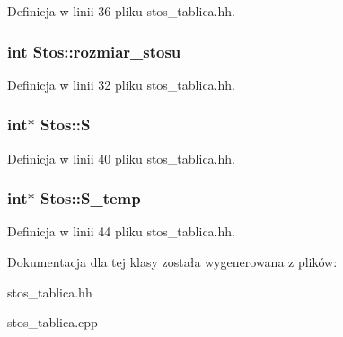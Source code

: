 \-Definicja w linii 36 pliku stos\-\_\-tablica.\-hh.

\hypertarget{class_stos_a62066b06b36c3f672ab0543c66deca28}{
\subsubsection[{rozmiar\-\_\-stosu}]{\setlength{\rightskip}{0pt plus 5cm}int {\bf \-Stos\-::rozmiar\-\_\-stosu}}}\label{class_stos_a62066b06b36c3f672ab0543c66deca28}


\-Definicja w linii 32 pliku stos\-\_\-tablica.\-hh.

\hypertarget{class_stos_a14e6f37b4871dfa99b8260ab550e0de7}{
\subsubsection[{\-S}]{\setlength{\rightskip}{0pt plus 5cm}int$\ast$ {\bf \-Stos\-::\-S}}}\label{class_stos_a14e6f37b4871dfa99b8260ab550e0de7}


\-Definicja w linii 40 pliku stos\-\_\-tablica.\-hh.

\hypertarget{class_stos_ae4176be703c706597b6918dc145dea84}{
\subsubsection[{\-S\-\_\-temp}]{\setlength{\rightskip}{0pt plus 5cm}int$\ast$ {\bf \-Stos\-::\-S\-\_\-temp}}}\label{class_stos_ae4176be703c706597b6918dc145dea84}


\-Definicja w linii 44 pliku stos\-\_\-tablica.\-hh.



\-Dokumentacja dla tej klasy została wygenerowana z plików\-:\begin{DoxyCompactItemize}
\item 
stos\-\_\-tablica.\-hh\item 
stos\-\_\-tablica.\-cpp\end{DoxyCompactItemize}
